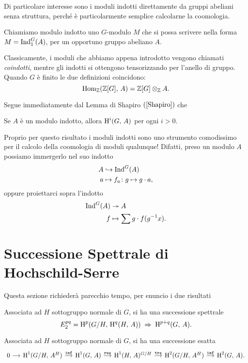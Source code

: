 Di particolare interesse sono i moduli indotti direttamente da gruppi abeliani senza struttura, perché è particolarmente semplice calcolarne la coomologia.

\begin{definition}
	Chiamiamo modulo indotto uno $ G $-modulo $ M $ che si possa scrivere nella forma $ M = \operatorname{Ind}_1^G(A) $, per un opportuno gruppo abeliano $ A $.
\end{definition}

Classicamente, i moduli che abbiamo appena introdotto vengono chiamati \emph{coindotti}, mentre gli indotti si ottengono tensorizzando per l'anello di gruppo. Quando $ G $ è finito le due definizioni coincidono:
	\[ \operatorname{Hom}_{\mathbb{Z}}(\mathbb{Z}[G], \, A)  = \mathbb{Z}[G] \otimes_{\mathbb{Z}} A. \]

Segue immediatamente dal Lemma di Shapiro $ (\ref{Shapiro}) $ che
\begin{corollary}\label{indotti}
	Se $ A $ è un modulo indotto, allora $ \operatorname{H}^i(G, \, A) $ per ogni $ i > 0 $.
\end{corollary}

Proprio per questo risultato i moduli indotti sono uno strumento comodissimo per il calcolo della coomologia di moduli qualunque! Difatti, preso un modulo $ A $ possiamo immergerlo nel suo indotto
\begin{align*}
A &\hookrightarrow \operatorname{Ind}^G(A) \\
a & \mapsto f_a \colon g \mapsto g \cdot a, \end{align*} 
oppure proiettarci sopra l'indotto
\begin{align*}
\operatorname{Ind}^G(A) &\twoheadrightarrow A  \\
f & \mapsto \sum g \cdot f(g^{-1}x).
\end{align*}

\section{Successione Spettrale di Hochschild-Serre}

Questa sezione richiederà parecchio tempo, per enuncio i due risultati

\begin{theorem}
	Associata ad $ H $ sottogruppo normale di $ G $, si ha una successione spettrale
	\[ E^{pq}_2 = \operatorname{H}^p(G/H, \, \operatorname{H}^q(H, \, A)) \;\Rightarrow\; \operatorname{H}^{p+q}(G, \, A). \]
	
\end{theorem}

\begin{corollary}
	Associata ad $ H $ sottogruppo normale di $ G $, si ha una successione esatta
	\[\begin{tikzcd}[column sep = small]
	0 \rar & \HH^1(G/H, \, A^H) \rar["\Inf"]
	& \HH^1(G, \, A) \rar["\Res"]
	& \HH^1(H, \, A)^{G/H} \rar["\texttt{trs}"]
	& \HH^2(G/H, \, A^H) \rar["\Inf"]
	& \HH^2(G, \, A).
	\end{tikzcd} \]
\end{corollary}

